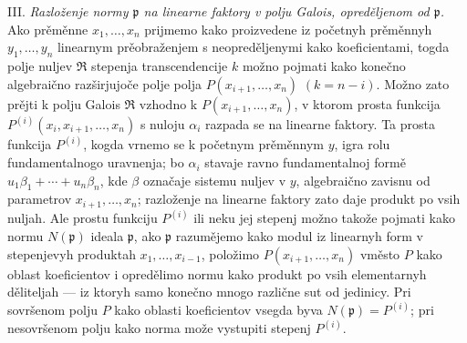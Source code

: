\documentclass[11pt]{article}
\providecommand{\frakp}{\mathfrak p}
\providecommand{\frakR}{\mathfrak R}
\begin{document}
\noindent III. \emph{Razloženje normy $\frakp$ na linearne faktory v polju Galois, opreděljenom od $\frakp$.} Ako prěměnne $x_1,\ldots,x_n$ prijmemo kako proizvedene iz početnyh prěměnnyh $y_1,\ldots,y_n$ linearnym prěobraženjem s neopreděljenymi kako koeficientami, togda polje nuljev $\frakR$ stepenja transcendencije $k$ možno pojmati kako konečno algebraično razširjujoče polje polja $P(x_{i+1},\ldots,x_n)$ $(k=n-i)$. Možno zato prějti k polju Galois $\frakR$ vzhodno k $P(x_{i+1},\ldots,x_n)$, v ktorom prosta funkcija $P^{(i)}(x_i,x_{i+1},\ldots,x_n)$ s nuloju $\alpha_i$ razpada se na linearne faktory. Ta prosta funkcija $P^{(i)}$, kogda vrnemo se k početnym prěměnnym $y$, igra rolu fundamentalnogo uravnenja; bo $\alpha_i$ stavaje ravno fundamentalnoj formě $u_1\beta_1+\cdots+u_n\beta_n$, kde $\beta$ označaje sistemu nuljev v $y$, algebraično zavisnu od parametrov $x_{i+1},\ldots,x_n$; razloženje na linearne faktory zato daje produkt po vsih nuljah. Ale prostu funkciju $P^{(i)}$ ili neku jej stepenj možno takože pojmati kako normu $N(\frakp)$ ideala $\frakp$, ako $\frakp$ razumějemo kako modul iz linearnyh form v stepenjevyh produktah $x_1,\ldots,x_{i-1}$, položimo $P(x_{i+1},\ldots,x_n)$ vměsto $P$ kako oblast koeficientov i opredělimo normu kako produkt po vsih elementarnyh děliteljah --- iz ktoryh samo konečno mnogo različne sut od jedinicy. Pri sovršenom polju $P$ kako oblasti koeficientov vsegda byva $N(\frakp)=P^{(i)}$; pri nesovršenom polju kako norma može vystupiti stepenj $P^{(i)}$.
\end{document}
